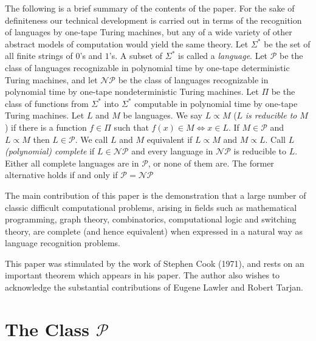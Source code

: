 \documentclass{scrartcl}
\begin{document}
The following is a brief summary of the contents of the paper. For the sake of definiteness our technical development is carried out in terms
of the recognition of languages by one-tape Turing machines, but any of a wide variety of other abstract models of computation would yield the
same theory. Let \(\Sigma^{*}\) be the set of all finite strings of \(0\)'s and \(1\)'s. A subset of \(\Sigma^{*}\) is called a \emph{language}.
Let \(\mathcal{P}\) be the class of languages recognizable in polynomial time by one-tape deterministic Turing machines, and let \(\mathcal{NP}\)
be the class of languages recognizable in polynomial time by one-tape nondeterministic Turing machines. Let \(\Pi\) be the class of functions from
\(\Sigma^{*}\) into \(\Sigma^{*}\) computable in polynomial time by one-tape Turing machines. Let \(L\) and \(M\) be languages. We say \(L \propto M\)
(\(L\) \emph{is reducible to} \(M\)) if there is a function \(f \in \Pi\) such that \(f(x) \in M \Leftrightarrow x \in L\). If \(M \in \mathcal{P}\)
and \(L \propto M\) then \(L \in \mathcal{P}\). We call \(L\) and \(M\) equivalent if \(L \propto M\) and \(M \propto L\). Call \(L\) \emph{(polynomial)
complete} if \(L \in \mathcal{NP}\) and every language in \(\mathcal{NP}\) is reducible to \(L\). Either all complete languages are in \(\mathcal{P}\),
or none of them are. The former alternative holds if and only if \(\mathcal{P} = \mathcal{NP}\)

The main contribution of this paper is the demonstration that a large number of classic difficult computational problems, arising in fields such
as mathematical programming, graph theory, combinatorics, computational logic and switching theory, are complete (and hence equivalent) when
expressed in a natural way as language recognition problems.

This paper was stimulated by the work of Stephen Cook (1971), and rests on an important theorem which appears in his paper.
The author also wishes to acknowledge the substantial contributions of Eugene Lawler and Robert Tarjan.

\section{The Class \(\mathcal{P}\)}
\end{document}
